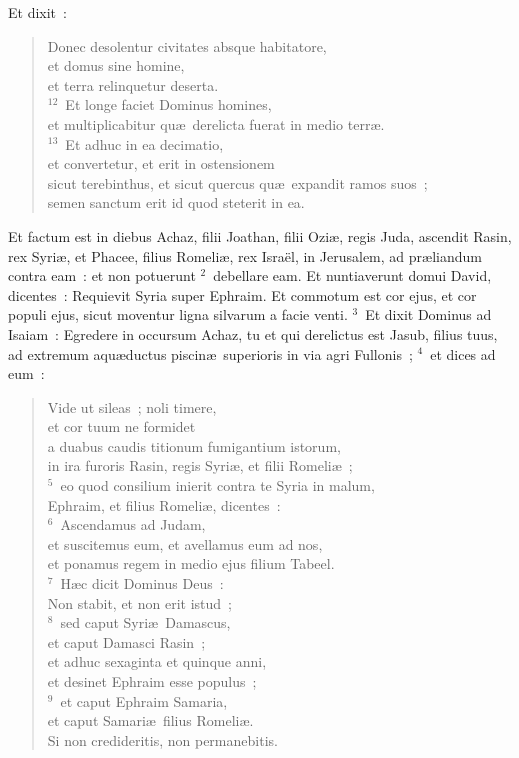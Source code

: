  Et dixit~: \begin{flushleft}\begin{verse}Donec desolentur civitates absque habitatore,\\ et domus sine homine,\\ et terra relinquetur deserta.\\
${}^{12}$~Et longe faciet Dominus homines,\\ et multiplicabitur qu\ae\ derelicta fuerat in medio terr\ae .\\
${}^{13}$~Et adhuc in ea decimatio,\\ et convertetur, et erit in ostensionem\\ sicut terebinthus, et sicut quercus qu\ae\ expandit ramos suos~;\\ semen sanctum erit id quod steterit in ea.\end{verse}\end{flushleft}



\lettrine[lines=3,image=true,loversize=0.05,lraise=-0.03]{E}{}t factum est in diebus Achaz, filii Joathan, filii Ozi\ae , regis Juda, ascendit Rasin, rex Syri\ae , et Phacee, filius Romeli\ae , rex Isra\"el, in Jerusalem, ad pr\ae liandum contra eam~: et non potuerunt
${}^{2}$~debellare eam. Et nuntiaverunt domui David, dicentes~: Requievit Syria super Ephraim. Et commotum est cor ejus, et cor populi ejus, sicut moventur ligna silvarum a facie venti.
${}^{3}$~Et dixit Dominus ad Isaiam~: Egredere in occursum Achaz, tu et qui derelictus est Jasub, filius tuus, ad extremum aqu\ae ductus piscin\ae\ superioris in via agri Fullonis~;
${}^{4}$~et dices ad eum~: \begin{flushleft}\begin{verse}Vide ut sileas~; noli timere,\\ et cor tuum ne formidet\\ a duabus caudis titionum fumigantium istorum,\\ in ira furoris Rasin, regis Syri\ae , et filii Romeli\ae~;\\
${}^{5}$~eo quod consilium inierit contra te Syria in malum,\\ Ephraim, et filius Romeli\ae , dicentes~:\\
${}^{6}$~Ascendamus ad Judam,\\ et suscitemus eum, et avellamus eum ad nos,\\ et ponamus regem in medio ejus filium Tabeel.\\
${}^{7}$~H\ae c dicit Dominus Deus~:\\ Non stabit, et non erit istud~;\\
${}^{8}$~sed caput Syri\ae\ Damascus,\\ et caput Damasci Rasin~;\\ et adhuc sexaginta et quinque anni,\\ et desinet Ephraim esse populus~;\\
${}^{9}$~et caput Ephraim Samaria,\\ et caput Samari\ae\ filius Romeli\ae .\\ Si non credideritis, non permanebitis.\end{verse}\end{flushleft}


